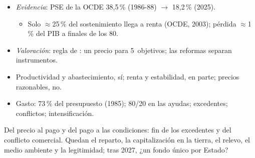 \documentclass{article}
\begin{document}
\begin{columnas}
\begin{itemize}
\item \emph{Evidencia}: PSE de la OCDE 38,5\,\% (1986-88) $\to$ 18,2\,\% (2025).
  \begin{itemize}
  \item Solo $\approx$25\,\% del sostenimiento llega a renta (OCDE, 2003); pérdida $\approx$1\,\% del PIB a finales de los 80.
  \end{itemize}
\item \emph{Valoración}: regla de : un precio para 5~objetivos; las reformas separan instrumentos.
\end{itemize}
\begin{itemize}
\item Productividad y abastecimiento, sí; renta y estabilidad, en parte; precios razonables, no.
\item Gasto: 73\,\% del presupuesto (1985); 80/20 en las ayudas; excedentes; conflictos; intensificación.
\end{itemize}

\begin{ideaclave}
Del precio al pago y del pago a las condiciones: fin de los excedentes y del conflicto comercial. Quedan el reparto, la capitalización en la tierra, el relevo, el medio ambiente y la legitimidad; tras 2027, ¿un fondo único por Estado?
\end{ideaclave}


\end{columnas}
\end{document}
